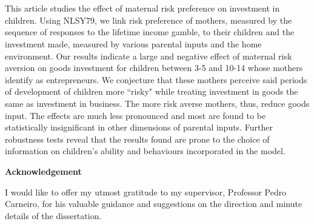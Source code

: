 \documentclass[emulatestandardclasses, 10pt, abstract = true]{scrartcl}
\makeatletter
\renewenvironment{abstract}{%
	\if@twocolumn
	\section*{\abstractname}%
	\else %
	\begin{center}%
		{\bfseries \large\abstractname\vspace{\z@}}%
	\end{center}%
	\quotation
	\fi}
{\if@twocolumn\else\endquotation\fi}
\makeatother
\begin{document}
\begin{titlingpage}
\paragraph*{\vspace{3cm}}
\begin{abstract}\large
	\noindent 
	This article studies the effect of maternal risk preference on investment in children. Using NLSY79, we link risk preference of mothers, measured by the sequence of responses to the lifetime income gamble, to their children and the investment made, measured by various parental inputs and the home environment. Our results indicate a large and negative effect of maternal risk aversion on goods investment for children between 3-5 and 10-14 whose mothers identify as entrepreneurs. We conjecture that these mothers perceive said periods of development of children more ``risky" while treating investment in goods the same as investment in business. The more risk averse mothers, thus, reduce goods input. The effects are much less pronounced and most are found to be statistically insignificant in other dimensions of parental inputs. Further robustness tests reveal that the results found are prone to the choice of information on children's ability and behaviours incorporated in the model.
\end{abstract}

\vspace{5cm}
\begin{center}
	\begin{minipage}[!h]{.89\linewidth}\small
			\begin{center}
				\large	\textbf{Acknowledgement}
				\end{center} \large
			\noindent I would like to offer my utmost gratitude to my supervisor, Professor Pedro Carneiro, for his valuable guidance and suggestions on the direction and minute details of the dissertation.
		\end{minipage}
\end{center}

\end{titlingpage}

\end{document}
